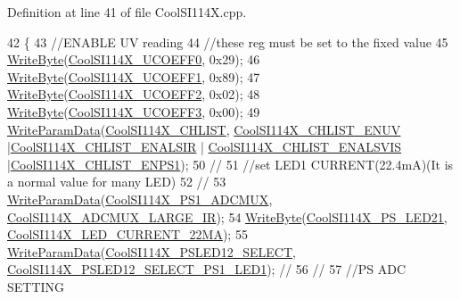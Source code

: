 Definition at line 41 of file Cool\+S\+I114\+X.\+cpp.


\begin{DoxyCode}
42 \{  
43   \textcolor{comment}{//ENABLE UV reading  }
44   \textcolor{comment}{//these reg must be set to the fixed value}
45   \hyperlink{class_cool_s_i114_x_ac5c8dc5ade604da7a1c8cd1586feefc2}{WriteByte}(\hyperlink{_cool_s_i114_x_8h_a3980544e34009c4d63585ce956a35bcc}{CoolSI114X\_UCOEFF0}, 0x29);
46   \hyperlink{class_cool_s_i114_x_ac5c8dc5ade604da7a1c8cd1586feefc2}{WriteByte}(\hyperlink{_cool_s_i114_x_8h_a38d8dd24e49ed5d92d67af32d460d695}{CoolSI114X\_UCOEFF1}, 0x89);
47   \hyperlink{class_cool_s_i114_x_ac5c8dc5ade604da7a1c8cd1586feefc2}{WriteByte}(\hyperlink{_cool_s_i114_x_8h_a9f754392283b31874b9206e9f066b495}{CoolSI114X\_UCOEFF2}, 0x02);
48   \hyperlink{class_cool_s_i114_x_ac5c8dc5ade604da7a1c8cd1586feefc2}{WriteByte}(\hyperlink{_cool_s_i114_x_8h_a6b18e04abc385afe47674c825a03c166}{CoolSI114X\_UCOEFF3}, 0x00);
49   \hyperlink{class_cool_s_i114_x_abf45eb10a6de1be16e68a51624fa2608}{WriteParamData}(\hyperlink{_cool_s_i114_x_8h_a4b819416e5ebc2384811575da4dac9cc}{CoolSI114X\_CHLIST}, 
      \hyperlink{_cool_s_i114_x_8h_af72f607af5e5e45c570f8bdcc1f2c85f}{CoolSI114X\_CHLIST\_ENUV} |\hyperlink{_cool_s_i114_x_8h_a7bb4dda95ba154dee1112d59888b0e87}{CoolSI114X\_CHLIST\_ENALSIR} | 
      \hyperlink{_cool_s_i114_x_8h_a16ebe81b50b5e64f3e38d6ad244dfdda}{CoolSI114X\_CHLIST\_ENALSVIS} |\hyperlink{_cool_s_i114_x_8h_aff16a80a5c0aae6d62e835e7fc6c8707}{CoolSI114X\_CHLIST\_ENPS1});
50   \textcolor{comment}{//}
51   \textcolor{comment}{//set LED1 CURRENT(22.4mA)(It is a normal value for many LED)}
52   \textcolor{comment}{//}
53   \hyperlink{class_cool_s_i114_x_abf45eb10a6de1be16e68a51624fa2608}{WriteParamData}(\hyperlink{_cool_s_i114_x_8h_aa9e491242b907af6e8d0da8b144a5608}{CoolSI114X\_PS1\_ADCMUX}, 
      \hyperlink{_cool_s_i114_x_8h_a961d0678d173fb7fce891b2518185f1a}{CoolSI114X\_ADCMUX\_LARGE\_IR});
54   \hyperlink{class_cool_s_i114_x_ac5c8dc5ade604da7a1c8cd1586feefc2}{WriteByte}(\hyperlink{_cool_s_i114_x_8h_a7f2493050319fe346a24b2b80f7a5207}{CoolSI114X\_PS\_LED21}, 
      \hyperlink{_cool_s_i114_x_8h_ab72bfb742ca1eb62908907fab1d8f5a0}{CoolSI114X\_LED\_CURRENT\_22MA});
55   \hyperlink{class_cool_s_i114_x_abf45eb10a6de1be16e68a51624fa2608}{WriteParamData}(\hyperlink{_cool_s_i114_x_8h_a7117ea6ff802c0da4a2e9f20ea8046c6}{CoolSI114X\_PSLED12\_SELECT}, 
      \hyperlink{_cool_s_i114_x_8h_a4a8d8e6fd5cb3c178925e18e5f9d9041}{CoolSI114X\_PSLED12\_SELECT\_PS1\_LED1}); \textcolor{comment}{//}
56   \textcolor{comment}{//}
57   \textcolor{comment}{//PS ADC SETTING}

\end{DoxyCode}
